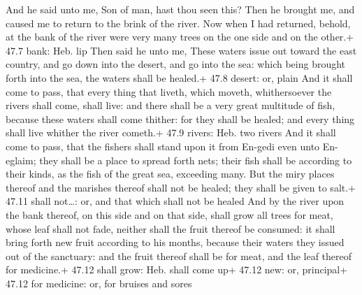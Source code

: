  And he said unto me, Son of man, hast thou seen this?
Then he brought me, and caused me to return to the brink of the river.
 Now when I had returned, behold, at the bank of the river
were very many trees on the one side and on the other.+ 47.7 bank: Heb.
lip  Then said he unto me, These waters issue out toward the
east country, and go down into the desert, and go into the sea: which
being brought forth into the sea, the waters shall be healed.+ 47.8
desert: or, plain  And it shall come to pass, that every
thing that liveth, which moveth, whithersoever the rivers shall come,
shall live: and there shall be a very great multitude of fish, because
these waters shall come thither: for they shall be healed; and every
thing shall live whither the river cometh.+ 47.9 rivers: Heb. two rivers
 And it shall come to pass, that the fishers shall stand
upon it from En-gedi even unto En-eglaim; they shall be a place to
spread forth nets; their fish shall be according to their kinds, as the
fish of the great sea, exceeding many.  But the miry places
thereof and the marishes thereof shall not be healed; they shall be
given to salt.+ 47.11 shall not\ldots: or, and that which shall not be
healed  And by the river upon the bank thereof, on this
side and on that side, shall grow all trees for meat, whose leaf shall
not fade, neither shall the fruit thereof be consumed: it shall bring
forth new fruit according to his months, because their waters they
issued out of the sanctuary: and the fruit thereof shall be for meat,
and the leaf thereof for medicine.+ 47.12 shall grow: Heb. shall come
up+ 47.12 new: or, principal+ 47.12 for medicine: or, for bruises and
sores

